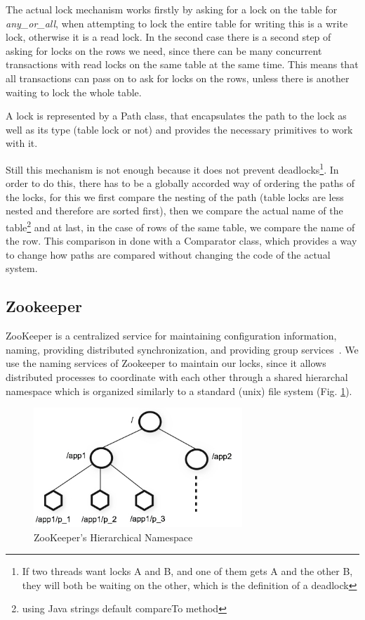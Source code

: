 The actual lock mechanism works firstly by asking for a lock on the table for \emph{any\_or\_all}, when attempting to lock the entire table for writing this is a write lock, otherwise it is a read lock. In the second case there is a second step of asking for locks on the rows we need, since there can be many concurrent transactions with read locks on the same table at the same time. This means that all transactions can pass on to ask for locks on the rows, unless there is another waiting to lock the whole table.

A lock is represented by a Path class, that encapsulates the path to the lock as well as its type (table lock or not) and provides the necessary primitives to work with it. 

Still this mechanism is not enough because it does not prevent deadlocks\footnote{If two threads want locks A and B, and one of them gets A and the other B, they will both be waiting on the other, which is the definition of a deadlock}. In order to do this, there has to be a globally accorded way of ordering the paths of the locks, for this we first compare the nesting of the path (table locks are less nested and therefore are sorted first), then we compare the actual name of the table\footnote{using Java strings default compareTo method} and at last, in the case of rows of the same table, we compare the name of the row. This comparison in done with a Comparator class, which provides a way to change how paths are compared without changing the code of the actual system.

\subsection{Zookeeper}
\label{sec:zoo}
ZooKeeper is a centralized service for maintaining configuration information, naming, providing distributed synchronization, and providing group services~\cite{zooDef}. We use the naming services of Zookeeper to maintain our locks, since it allows distributed processes to coordinate with each other through a shared hierarchal namespace which is organized similarly to a standard (unix) file system (Fig. \ref{fig:zoo_namespace}). 

\begin{figure}[htb]
  \begin{center}
    \leavevmode
    \includegraphics[width=0.7\textwidth]{images/zknamespace.jpg}
  \end{center}
  \caption{ZooKeeper's Hierarchical Namespace}
  \label{fig:zoo_namespace}
\end{figure}

